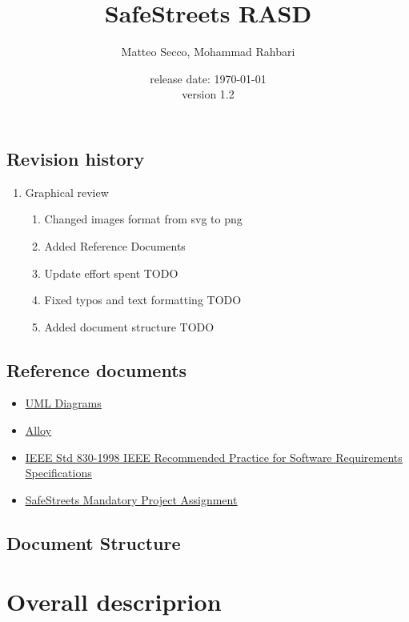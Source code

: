 \documentclass{article}
\title{SafeStreets RASD}
\date{release date: \today\\version 1.2}
\author{Matteo Secco, Mohammad Rahbari}
\newcommand{\link}[2]{{\color{blue}\underline{\href{#1}{#2}}}}
\begin{document}
\maketitle
\newpage
\tableofcontents
\pagebreak
{}


	\subsection{Revision history}
		\begin{enumerate}
			\item Graphical review
			\begin{enumerate}[label*=\arabic*.]
				\item Changed images format from svg to png
				\item Added Reference Documents
				\item Update effort spent TODO
				\item Fixed typos and text formatting	TODO
				\item Added document structure	TODO
				
			\end{enumerate}
		\end{enumerate}
	\subsection{Reference documents}
		\begin{itemize}
			\item \link{https://www.uml-diagrams.org/}{UML Diagrams}
			\item \link{http://alloy.lcs.mit.edu/alloy/documentation.html}{Alloy}
			\item \link{http://www.math.uaa.alaska.edu/~afkjm/cs401/IEEE830.pdf}{IEEE	Std	830-1998	IEEE	Recommended	Practice	for	Software	Requirements	Specifications}
			\item \link{https://drive.google.com/file/d/1VYhcYWY0I6FrwtEWGsfs-CzNf0mMMaP2/view?usp=sharing}{SafeStreets Mandatory Project Assignment}
		\end{itemize}
	\subsection{Document Structure}

\newpage
\section{Overall descriprion}
\end{document}
